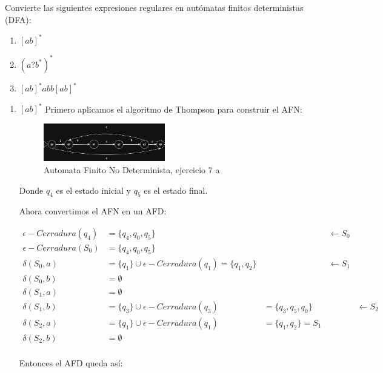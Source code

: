 \newpage
\begin{Pro}
   Convierte las siguientes expresiones regulares en autómatas finitos deterministas (DFA):
   \begin{enumerate}
       \item $[ab]^*$
       \item $(a?b^*)^*$
       \item $[ab]^*abb[ab]^*$
    \end{enumerate}
\end{Pro}

\begin{enumerate}
    \item $[ab]^*$
    Primero aplicamos el algoritmo de Thompson para construir el AFN:
    \begin{figure}[h!]
        \centering
        \includegraphics[width=0.5\textwidth]{images/nfa7.drawio.png}
        \caption{Automata Finito No Determinista, ejercicio 7 a}
    \end{figure}

    Donde $q_4$ es el estado inicial y $q_5$ es el estado final.

    Ahora convertimos el AFN en un AFD: 

    \begin{align*}
        \epsilon-Cerradura(q_4) &= \{q_4,q_0, q_5\} && \leftarrow S_0 \\
        \epsilon-Cerradura(S_0) &= \{q_4,q_0, q_5\} \\
        \delta(S_0,a) &= \{q_1\} \cup \epsilon-Cerradura(q_1) 
        = \{q_1, q_2\} && \leftarrow S_1 \\
        \delta(S_0,b) &= \emptyset \\ 
        \delta(S_1,a) &= \emptyset \\
        \delta(S_1,b) &= \{q_3\} \cup \epsilon-Cerradura(q_3)
        &= \{q_3, q_5, q_0\} && \leftarrow S_2 \\
        \delta(S_2,a) &= \{q_1\} \cup \epsilon-Cerradura(q_1)
        &= \{q_1, q_2\} = S_1 \\
        \delta(S_2,b) &= \emptyset \\
    \end{align*}

    Entonces el AFD queda así:


\end{enumerate}
